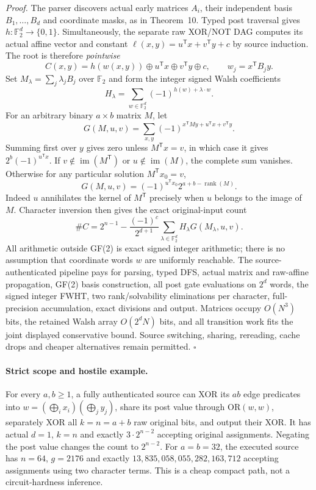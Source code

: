 \documentclass[11pt]{article}
\begin{document}
\emph{Proof.} The parser discovers actual early matrices $A_i$, their independent basis $B_1,\dots,B_d$ and coordinate masks, as in Theorem~10. Typed post traversal gives $h:\mathbb F_2^d\to\{0,1\}$. Simultaneously, the separate raw XOR/NOT DAG computes its actual affine vector and constant $\ell(x,y)=u^{\mathsf T}x+v^{\mathsf T}y+c$ by source induction. The root is therefore \emph{pointwise}
\[
C(x,y)=h(w(x,y))\oplus u^{\mathsf T}x\oplus v^{\mathsf T}y\oplus c,
\qquad w_j=x^{\mathsf T}B_jy .
\]
Set $M_\lambda=\sum_j\lambda_jB_j$ over $\mathbb F_2$ and form the integer signed Walsh coefficients
\[
H_\lambda=\sum_{w\in\mathbb F_2^d}(-1)^{h(w)+\lambda\cdot w}.
\]
For an arbitrary binary $a\times b$ matrix $M$, let
\[
G(M,u,v)=\sum_{x,y}(-1)^{x^{\mathsf T}My+u^{\mathsf T}x+v^{\mathsf T}y}.
\]
Summing first over $y$ gives zero unless $M^{\mathsf T}x=v$, in which case it gives $2^b(-1)^{u^{\mathsf T}x}$. If $v\notin\operatorname{im}(M^{\mathsf T})$ or $u\notin\operatorname{im}(M)$, the complete sum vanishes. Otherwise for any particular solution $M^{\mathsf T}x_0=v$,
\[
G(M,u,v)=(-1)^{u^{\mathsf T}x_0}2^{a+b-\operatorname{rank}(M)}.
\]
Indeed $u$ annihilates the kernel of $M^{\mathsf T}$ precisely when $u$ belongs to the image of $M$. Character inversion then gives the exact original-input count
\[
\boxed{\#C=2^{n-1}-\frac{(-1)^c}{2^{d+1}}
          \sum_{\lambda\in\mathbb F_2^d}
             H_\lambda G(M_\lambda,u,v).}
\]
All arithmetic outside GF(2) is exact signed integer arithmetic; there is no assumption that coordinate words $w$ are uniformly reachable. The source-authenticated pipeline pays for parsing, typed DFS, actual matrix and raw-affine propagation, GF(2) basis construction, all post gate evaluations on $2^d$ words, the signed integer FWHT, two rank/solvability eliminations per character, full-precision accumulation, exact divisions and output. Matrices occupy $O(N^3)$ bits, the retained Walsh array $O(2^dN)$ bits, and all transition work fits the joint displayed conservative bound. Source switching, sharing, rereading, cache drops and cheaper alternatives remain permitted. \hfill$\square$

\paragraph{Strict scope and hostile example.}
For every $a,b\ge1$, a fully authenticated source can XOR its $ab$ edge predicates into $w=(\bigoplus_i x_i)(\bigoplus_j y_j)$, share its post value through OR$(w,w)$, separately XOR all $k=n=a+b$ raw original bits, and output their XOR. It has actual $d=1$, $k=n$ and exactly $3\cdot2^{n-2}$ accepting original assignments. Negating the post value changes the count to $2^{n-2}$. For $a=b=32$, the executed source has $n=64$, $g=2176$ and exactly $13{,}835{,}058{,}055{,}282{,}163{,}712$ accepting assignments using two character terms. This is a cheap compact path, not a circuit-hardness inference.
\end{document}
